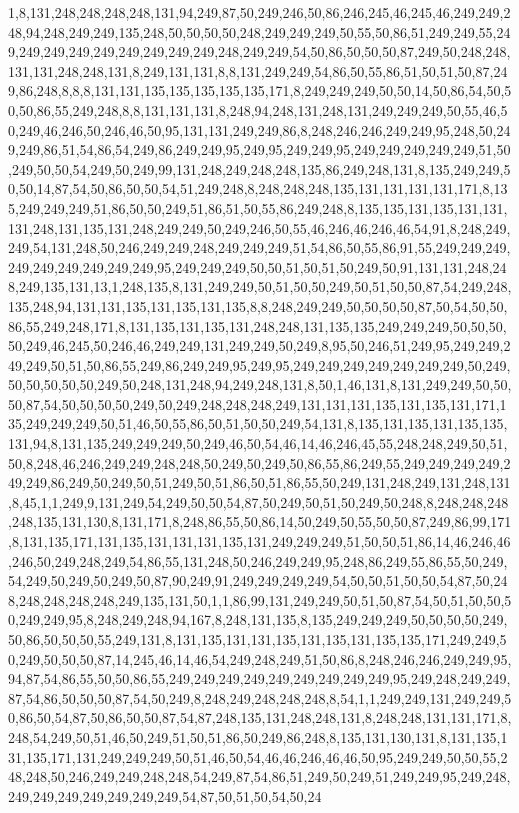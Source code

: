 1,8,131,248,248,248,248,131,94,249,87,50,249,246,50,86,246,245,46,245,46,249,249,248,94,248,249,249,135,248,50,50,50,50,248,249,249,249,50,55,50,86,51,249,249,55,249,249,249,249,249,249,249,249,249,248,249,249,54,50,86,50,50,50,87,249,50,248,248,131,131,248,248,131,8,249,131,131,8,8,131,249,249,54,86,50,55,86,51,50,51,50,87,249,86,248,8,8,8,131,131,135,135,135,135,135,171,8,249,249,249,50,50,14,50,86,54,50,50,50,86,55,249,248,8,8,131,131,131,8,248,94,248,131,248,131,249,249,249,50,55,46,50,249,46,246,50,246,46,50,95,131,131,249,249,86,8,248,246,246,249,249,95,248,50,249,249,86,51,54,86,54,249,86,249,249,95,249,95,249,249,95,249,249,249,249,249,51,50,249,50,50,54,249,50,249,99,131,248,249,248,248,135,86,249,248,131,8,135,249,249,50,50,14,87,54,50,86,50,50,54,51,249,248,8,248,248,248,135,131,131,131,131,171,8,135,249,249,249,51,86,50,50,249,51,86,51,50,55,86,249,248,8,135,135,131,135,131,131,131,248,131,135,131,248,249,249,50,249,246,50,55,46,246,46,246,46,54,91,8,248,249,249,54,131,248,50,246,249,249,248,249,249,249,51,54,86,50,55,86,91,55,249,249,249,249,249,249,249,249,249,95,249,249,249,50,50,51,50,51,50,249,50,91,131,131,248,248,249,135,131,13,1,248,135,8,131,249,249,50,51,50,50,249,50,51,50,50,87,54,249,248,135,248,94,131,131,135,131,135,131,135,8,8,248,249,249,50,50,50,50,87,50,54,50,50,86,55,249,248,171,8,131,135,131,135,131,248,248,131,135,135,249,249,249,50,50,50,50,249,46,245,50,246,46,249,249,131,249,249,50,249,8,95,50,246,51,249,95,249,249,249,249,50,51,50,86,55,249,86,249,249,95,249,95,249,249,249,249,249,249,249,50,249,50,50,50,50,50,249,50,248,131,248,94,249,248,131,8,50,1,46,131,8,131,249,249,50,50,50,87,54,50,50,50,50,249,50,249,248,248,248,249,131,131,131,135,131,135,131,171,135,249,249,249,50,51,46,50,55,86,50,51,50,50,249,54,131,8,135,131,135,131,135,135,131,94,8,131,135,249,249,249,50,249,46,50,54,46,14,46,246,45,55,248,248,249,50,51,50,8,248,46,246,249,249,248,248,50,249,50,249,50,86,55,86,249,55,249,249,249,249,249,249,86,249,50,249,50,51,249,50,51,86,50,51,86,55,50,249,131,248,249,131,248,131,8,45,1,1,249,9,131,249,54,249,50,50,54,87,50,249,50,51,50,249,50,248,8,248,248,248,248,135,131,130,8,131,171,8,248,86,55,50,86,14,50,249,50,55,50,50,87,249,86,99,171,8,131,135,171,131,135,131,131,131,135,131,249,249,249,51,50,50,51,86,14,46,246,46,246,50,249,248,249,54,86,55,131,248,50,246,249,249,95,248,86,249,55,86,55,50,249,54,249,50,249,50,249,50,87,90,249,91,249,249,249,249,54,50,50,51,50,50,54,87,50,248,248,248,248,248,249,135,131,50,1,1,86,99,131,249,249,50,51,50,87,54,50,51,50,50,50,249,249,95,8,248,249,248,94,167,8,248,131,135,8,135,249,249,249,50,50,50,50,249,50,86,50,50,50,55,249,131,8,131,135,131,131,135,131,135,131,135,135,171,249,249,50,249,50,50,50,87,14,245,46,14,46,54,249,248,249,51,50,86,8,248,246,246,249,249,95,94,87,54,86,55,50,50,86,55,249,249,249,249,249,249,249,249,249,95,249,248,249,249,87,54,86,50,50,50,87,54,50,249,8,248,249,248,248,248,8,54,1,1,249,249,131,249,249,50,86,50,54,87,50,86,50,50,87,54,87,248,135,131,248,248,131,8,248,248,131,131,171,8,248,54,249,50,51,46,50,249,51,50,51,86,50,249,86,248,8,135,131,130,131,8,131,135,131,135,171,131,249,249,249,50,51,46,50,54,46,46,246,46,46,50,95,249,249,50,50,55,248,248,50,246,249,249,248,248,54,249,87,54,86,51,249,50,249,51,249,249,95,249,248,249,249,249,249,249,249,249,54,87,50,51,50,54,50,24
